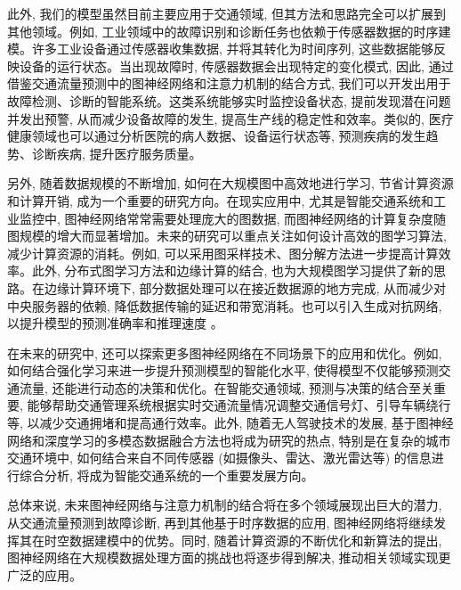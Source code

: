此外, 我们的模型虽然目前主要应用于交通领域, 但其方法和思路完全可以扩展到其他领域。例如, 工业领域中的故障识别和诊断任务也依赖于传感器数据的时序建模。许多工业设备通过传感器收集数据, 并将其转化为时间序列, 这些数据能够反映设备的运行状态。当出现故障时, 传感器数据会出现特定的变化模式, 因此, 通过借鉴交通流量预测中的图神经网络和注意力机制的结合方式, 我们可以开发出用于故障检测、诊断的智能系统。这类系统能够实时监控设备状态, 提前发现潜在问题并发出预警, 从而减少设备故障的发生, 提高生产线的稳定性和效率。类似的, 医疗健康领域也可以通过分析医院的病人数据、设备运行状态等, 预测疾病的发生趋势、诊断疾病, 提升医疗服务质量。

另外, 随着数据规模的不断增加, 如何在大规模图中高效地进行学习, 节省计算资源和计算开销, 成为一个重要的研究方向。在现实应用中, 尤其是智能交通系统和工业监控中, 图神经网络常常需要处理庞大的图数据, 而图神经网络的计算复杂度随图规模的增大而显著增加。未来的研究可以重点关注如何设计高效的图学习算法, 减少计算资源的消耗。例如, 可以采用图采样技术、图分解方法进一步提高计算效率。此外, 分布式图学习方法和边缘计算的结合, 也为大规模图学习提供了新的思路。在边缘计算环境下, 部分数据处理可以在接近数据源的地方完成, 从而减少对中央服务器的依赖, 降低数据传输的延迟和带宽消耗。也可以引入生成对抗网络, 以提升模型的预测准确率和推理速度 \parencite{2023_钟强_基于图卷积神经网络的交通流预测研究}。

在未来的研究中, 还可以探索更多图神经网络在不同场景下的应用和优化。例如, 如何结合强化学习来进一步提升预测模型的智能化水平, 使得模型不仅能够预测交通流量, 还能进行动态的决策和优化。在智能交通领域, 预测与决策的结合至关重要, 能够帮助交通管理系统根据实时交通流量情况调整交通信号灯、引导车辆绕行等, 以减少交通拥堵和提高通行效率。此外, 随着无人驾驶技术的发展, 基于图神经网络和深度学习的多模态数据融合方法也将成为研究的热点, 特别是在复杂的城市交通环境中, 如何结合来自不同传感器 (如摄像头、雷达、激光雷达等) 的信息进行综合分析, 将成为智能交通系统的一个重要发展方向。

总体来说, 未来图神经网络与注意力机制的结合将在多个领域展现出巨大的潜力, 从交通流量预测到故障诊断, 再到其他基于时序数据的应用, 图神经网络将继续发挥其在时空数据建模中的优势。同时, 随着计算资源的不断优化和新算法的提出, 图神经网络在大规模数据处理方面的挑战也将逐步得到解决, 推动相关领域实现更广泛的应用。